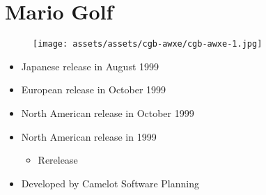 \documentclass{book}
\begin{document}
\begingroup \chapter*{Mario Golf} \endgroup
\begin{figure}[H]
\vskip 4pt
\centering
\texttt{[image: assets/assets/cgb-awxe/cgb-awxe-1.jpg]}\end{figure}
\begin{itemize} [nosep]




\item Japanese release in August 1999







\item European release in October 1999







\item North American release in October 1999







\item North American release in 1999
\begin{itemize} [nosep]\item Rerelease\end{itemize}\noindent































\item Developed by Camelot Software Planning

\end{itemize}\noindent
\end{document}
